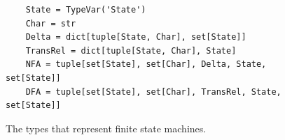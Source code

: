 \begin{figure}[!ht]
\centering
\begin{verbatim}
    State = TypeVar('State')
    Char = str
    Delta = dict[tuple[State, Char], set[State]]
    TransRel = dict[tuple[State, Char], State]
    NFA = tuple[set[State], set[Char], Delta, State, set[State]]
    DFA = tuple[set[State], set[Char], TransRel, State, set[State]]
\end{verbatim}
\vspace*{-0.3cm}
\caption{The types that represent finite state machines.}
\label{fig:01-NFA-2-DFA.ipynb:types}
\end{figure}

